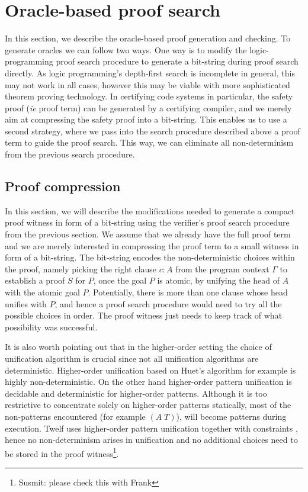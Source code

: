 \documentclass{acmconf}
\begin{document}
\section{Oracle-based proof search}
\label{sec:oracles}

In this section, we describe the oracle-based proof generation and
checking. To generate oracles we can follow two ways. One way is to
modify the logic-programming proof search procedure to generate a
bit-string during proof search directly. As logic programming's
depth-first search is incomplete in general, this may not work in all
cases, however this may be viable with more sophisticated theorem proving
technology. In certifying code systems in particular, the safety proof
({\em ie} proof term) can be generated by a certifying compiler, and
we merely aim at compressing the safety proof into a bit-string. This
enables us to use a second strategy, where we pass into the search procedure
described above a proof term to guide the proof search. This way, we
can eliminate all non-determinism from the previous search procedure.

\subsection{Proof compression}

In this section, we will describe the modifications needed to generate
a compact proof witness in form of a bit-string using the verifier's
proof search procedure from the previous section. We assume that we
already have the full proof term and we are merely interested in
compressing the proof term to a small witness in form of a bit-string.
The bit-string encodes the non-deterministic choices within the proof, namely picking
the right clause $c:A$ from the program context $\Gamma$ to establish a
proof $S$ for $P$, once the goal $P$ is atomic, by unifying the head
of $A$ with the atomic goal $P$. Potentially, there is more than one
clause whose head unifies with $P$, and hence a proof search procedure
would need to try all the possible choices in order. The proof witness
just needs to keep track of what possibility was successful.

It is also worth pointing out that in the higher-order setting the
choice of unification algorithm is crucial since not all unification
algorithms are deterministic. Higher-order unification based on Huet's
algorithm \cite{Huet75} for example is highly non-deterministic. On the
other hand higher-order pattern unification \cite{Miller91jlc} is
decidable and deterministic for higher-order patterns. Although it is too restrictive to
concentrate solely on higher-order patterns statically, most of the
non-patterns encountered (for example $(A\;T)$), will become patterns
during execution. Twelf uses higher-order pattern unification together
with constraints \cite{Pfenning91lf}, hence no non-determinism arises
in unification and no additional choices need to be stored in the proof
witness\footnote{Susmit: please check this with Frank}. 
\end{document}
